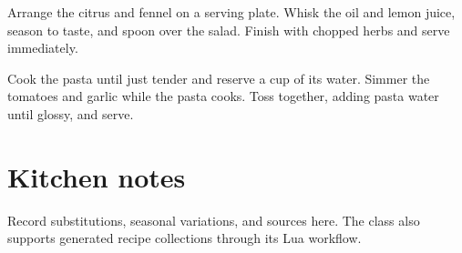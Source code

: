 \documentclass[11pt,a4paper]{awesome-cookbook}
\begin{document}
\beginCookbook
\beginRecipes
{}
\info[servings=4,time=15,source=Kitchen notes]{}
\begin{ingredients}
\end{ingredients}
\begin{preparation}
  \step Arrange the citrus and fennel on a serving plate.
  \step Whisk the oil and lemon juice, season to taste, and spoon over the salad.
  \step Finish with chopped herbs and serve immediately.
\end{preparation}
\info[servings=2,time=30]{}
\begin{ingredients}
\end{ingredients}
\begin{preparation}
  \step Cook the pasta until just tender and reserve a cup of its water.
  \step Simmer the tomatoes and garlic while the pasta cooks.
  \step Toss together, adding pasta water until glossy, and serve.
\end{preparation}
\beginAppendices
\chapter{Kitchen notes}
Record substitutions, seasonal variations, and sources here. The class also
supports generated recipe collections through its Lua workflow.
\end{document}
